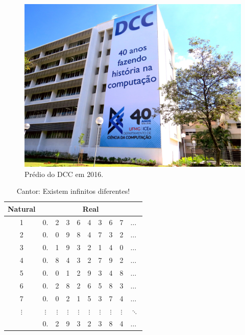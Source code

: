 \documentclass[
	msc, %
	english %
]{ppgccufmg}
\begin{document}
		\begin{figure}[h]
			\centering
			\includegraphics[width=\textwidth]{img/dcc.jpg}
			\caption{Prédio do DCC em 2016.}
			\label{fig:exemplo}
		\end{figure}
	
		\lipsum[5]
		
		\begin{table}[h]
			\centering
			\begin{tabular}{c|ccccccccl}
				Natural & \multicolumn{9}{c}{Real}   \\ \hline
				1 & 0.  & {\color{red} 2}  & 3   & 6   & 4   & 3   & 6   & 7   & $\ldots$ \\
				2  & 0.  & 0   & {\color{red} 9}  & 8   & 4   & 7   & 3   & 2   & $\ldots$ \\
				3  & 0.  & 1   & 9   & {\color{red} 3}  & 2   & 1   & 4   & 0   & $\ldots$ \\
				4  & 0.  & 8   & 4   & 3   & {\color{red} 2}  & 7   & 9   & 2   & $\ldots$ \\
				5  & 0.  & 0   & 1   & 2   & 9   & {\color{red} 3}  & 4   & 8   & $\ldots$ \\
				6  & 0.  & 2   & 8   & 2   & 6   & 5   & {\color{red} 8}  & 3   & $\ldots$ \\
				7  & 0.  & 0   & 2   & 1   & 5   & 3   & 7   & {\color{red} 4}  & $\ldots$ \\
				$\vdots$ & $\vdots$  & $\vdots$  & $\vdots$  & $\vdots$  & $\vdots$  & $\vdots$  & $\vdots$  & $\vdots$  & $\ddots$ \\ \hline
				\multicolumn{1}{l|}{} & \multicolumn{1}{l}{0.} & \multicolumn{1}{l}{{\color{red} 2}} & \multicolumn{1}{l}{{\color{red} 9}} & \multicolumn{1}{l}{{\color{red} 3}} & \multicolumn{1}{l}{{\color{red} 2}} & \multicolumn{1}{l}{{\color{red} 3}} & \multicolumn{1}{l}{{\color{red} 8}} & \multicolumn{1}{l}{{\color{red} 4}} & $\ldots$
			\end{tabular}
			\caption{Cantor: Existem infinitos diferentes!}
			\label{tab:exemplo}
		\end{table}
\end{document}
